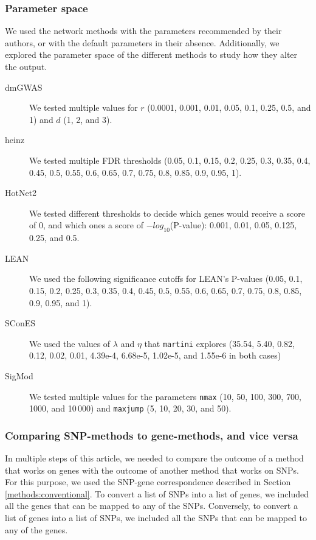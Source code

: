 \documentclass[10pt,letterpaper]{article}
\begin{document}
\subsubsection{Parameter space}
\label{methods:parameters}

We used the network methods with the parameters recommended by their authors, or with the default parameters in their absence. Additionally, we explored the parameter space of the different methods to study how they alter the output.

\begin{description}
\item[{dmGWAS}] We tested multiple values for $r$ (0.0001, 0.001, 0.01, 0.05, 0.1, 0.25, 0.5, and 1) and $d$ (1, 2, and 3). 
\item[{heinz}] We tested multiple FDR thresholds (0.05, 0.1, 0.15, 0.2, 0.25, 0.3, 0.35, 0.4, 0.45, 0.5, 0.55, 0.6, 0.65, 0.7, 0.75, 0.8, 0.85, 0.9, 0.95, 1).
\item[{HotNet2}] We tested different thresholds to decide which genes would receive a score of 0, and which ones a score of $-log_{10}$(P-value): 0.001, 0.01, 0.05, 0.125, 0.25, and 0.5.
\item[{LEAN}] We used the following significance cutoffs for LEAN's P-values (0.05, 0.1, 0.15, 0.2, 0.25, 0.3, 0.35, 0.4, 0.45, 0.5, 0.55, 0.6, 0.65, 0.7, 0.75, 0.8, 0.85, 0.9, 0.95, and 1).
\item[{SConES}] We used the values of $\lambda$ and $\eta$ that \texttt{martini} explores (35.54, 5.40, 0.82, 0.12, 0.02, 0.01, 4.39e-4, 6.68e-5, 1.02e-5, and 1.55e-6 in both cases)
\item[{SigMod}] We tested multiple values for the parameters \texttt{nmax} (10, 50, 100, 300, 700, 1000, and 10\,000) and \texttt{maxjump} (5, 10, 20, 30, and 50).
\end{description}

\subsubsection{Comparing SNP-methods to gene-methods, and vice versa}
\label{methods:snp2gene}

In multiple steps of this article, we needed to compare the outcome of a method that works on genes with the outcome of another method that works on SNPs. For this purpose, we used the SNP-gene correspondence described in Section \ref{methods:conventional}. To convert a list of SNPs into a list of genes, we included all the genes that can be mapped to any of the SNPs. Conversely, to convert a list of genes into a list of SNPs, we included all the SNPs that can be mapped to any of the genes.
\end{document}
